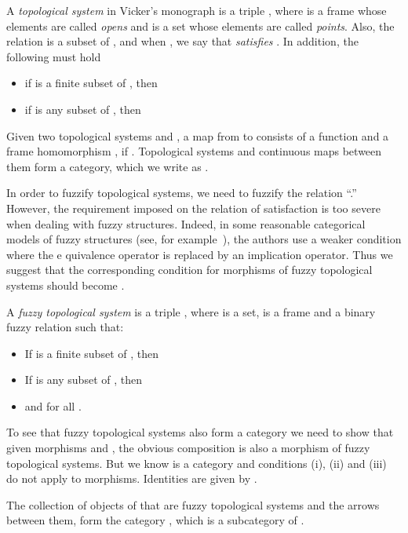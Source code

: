 \documentclass[11pt]{article}
\newenvironment{definition}[1][Definition]{\begin{trivlist}
\item[\hskip \labelsep {\bfseries #1}]}{\end{trivlist}}
\begin{document}
A {\em topological system} in Vicker's monograph\cite{vickers90} is a triple
, where  is a frame whose elements are called {\em opens} and 
 is a set whose elements are called {\em points}. Also,  the relation   
is a subset of , and when , we say that  {\em satisfies} 
. In addition, the following must hold
\begin{itemize}
\item if  is a finite subset of , then

\item if  is any subset of , then 

\end{itemize}

Given two topological systems  and , a map from  to  
consists of a  function  and a frame homomorphism ,
if . Topological systems and 
continuous maps between them form a category, which we write as .

In order to fuzzify topological systems, we need to fuzzify the relation ``.''
However, the requirement imposed on the relation of satisfaction is too severe when dealing
with fuzzy structures. Indeed, in some reasonable categorical models of fuzzy structures 
(see, for example~\cite{barr91,syropoulos06}), the authors use a weaker condition where the e
quivalence operator is replaced by an implication operator. Thus we suggest that the corresponding condition for morphisms of  fuzzy topological systems should become 
.   
\begin{definition}
A {\em fuzzy topological system} is a triple , where  is a set,  is a frame
and  a binary fuzzy relation such that:
\begin{itemize}
\item[(i)] If  is a finite subset of , then

\item[(ii)] If  is any subset of , then 

\item[(iii)]  and  for all .
\end{itemize} 
\end{definition}
To see that fuzzy topological systems also form a category we need to show that given morphisms  and  , the obvious composition   is also a morphism of fuzzy topological systems. But we know  is a category and conditions (i), (ii) and (iii) do not apply to morphisms. Identities are given by .

The collection of objects of  that are fuzzy topological
systems and the arrows between them, form the category , which is a
 subcategory of . 
\end{document}
